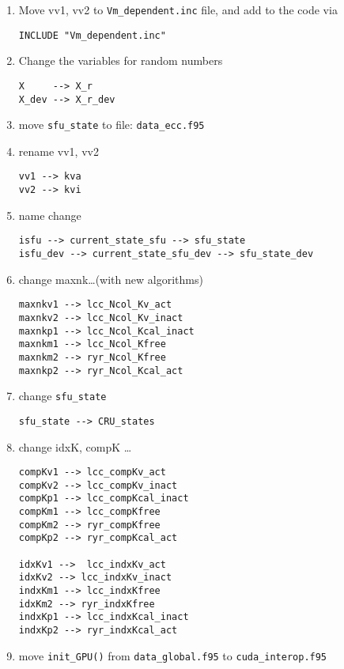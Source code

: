 \begin{enumerate}
\item Move vv1, vv2 to \verb!Vm_dependent.inc! file, and add to the
  code via
\begin{verbatim}
INCLUDE "Vm_dependent.inc"
\end{verbatim}


\item Change the variables for random numbers
\begin{verbatim}
X     --> X_r
X_dev --> X_r_dev
\end{verbatim}


\item move \verb!sfu_state! to file: \verb!data_ecc.f95!

\item rename vv1, vv2
\begin{verbatim}
vv1 --> kva
vv2 --> kvi
\end{verbatim}


\item name change
\begin{verbatim}
isfu --> current_state_sfu --> sfu_state
isfu_dev --> current_state_sfu_dev --> sfu_state_dev
\end{verbatim}

\item change maxnk\ldots (with new algorithms)
\begin{verbatim}
maxnkv1 --> lcc_Ncol_Kv_act
maxnkv2 --> lcc_Ncol_Kv_inact
maxnkp1 --> lcc_Ncol_Kcal_inact
maxnkm1 --> lcc_Ncol_Kfree
maxnkm2 --> ryr_Ncol_Kfree
maxnkp2 --> ryr_Ncol_Kcal_act
\end{verbatim}

\item change \verb!sfu_state! 
\begin{verbatim}
sfu_state --> CRU_states
\end{verbatim}

\item change idxK, compK \ldots 
\begin{verbatim}
compKv1 --> lcc_compKv_act
compKv2 --> lcc_compKv_inact
compKp1 --> lcc_compKcal_inact
compKm1 --> lcc_compKfree
compKm2 --> ryr_compKfree
compKp2 --> ryr_compKcal_act
       
idxKv1 -->  lcc_indxKv_act
idxKv2 --> lcc_indxKv_inact
indxKm1 --> lcc_indxKfree
idxKm2 --> ryr_indxKfree
indxKp1 --> lcc_indxKcal_inact
indxKp2 --> ryr_indxKcal_act
\end{verbatim}

\item move \verb!init_GPU()! from \verb!data_global.f95! to
\verb!cuda_interop.f95!


\end{enumerate}
